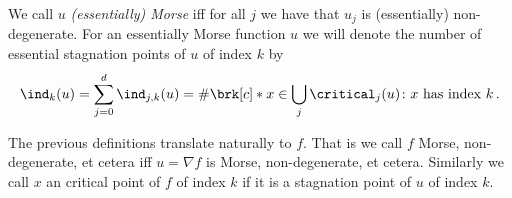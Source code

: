 \begin{definition}
  We call $u$ \emph{(essentially) Morse} iff for all $j$ we have that $u_j$ is (essentially) non-degenerate.
  For an essentially Morse function $u$ we will denote the number of
  essential stagnation points of $u$ of index $k$ by
  \begin{align*}
    \ind_k(u)=\sum_{j=0}^d\ind_{j,k}(u)=\#\brk[c]*{x\in\bigcup_j\critical_j(u)\colon x\text{ has index }k}\,.
  \end{align*}
\end{definition}

The previous definitions translate naturally to $f$.
That is we call $f$ Morse, non-degenerate, et cetera iff $u=\nabla f$ is Morse, non-degenerate, et cetera.
Similarly we call $x$ an critical point of $f$ of index $k$ if it is a
stagnation point of $u$ of index $k$.

